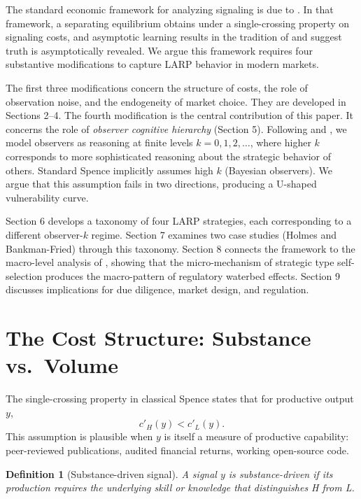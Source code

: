\documentclass[11pt]{article}
\newtheorem{definition}{Definition}
\begin{document}
The standard economic framework for analyzing signaling is due to \cite{spence1973}. In that framework, a separating equilibrium obtains under a single-crossing property on signaling costs, and asymptotic learning results in the tradition of \cite{diamond1989} and \cite{tirole1996} suggest truth is asymptotically revealed. We argue this framework requires four substantive modifications to capture LARP behavior in modern markets.

The first three modifications concern the structure of costs, the role of observation noise, and the endogeneity of market choice. They are developed in Sections 2--4. The fourth modification is the central contribution of this paper. It concerns the role of \emph{observer cognitive hierarchy} (Section 5). Following \cite{nagel1995} and \cite{camerer2004}, we model observers as reasoning at finite levels $k = 0, 1, 2, \ldots$, where higher $k$ corresponds to more sophisticated reasoning about the strategic behavior of others. Standard Spence implicitly assumes high $k$ (Bayesian observers). We argue that this assumption fails in two directions, producing a U-shaped vulnerability curve.

Section 6 develops a taxonomy of four LARP strategies, each corresponding to a different observer-$k$ regime. Section 7 examines two case studies (Holmes and Bankman-Fried) through this taxonomy. Section 8 connects the framework to the macro-level analysis of \cite{vosteen2026waterbed}, showing that the micro-mechanism of strategic type self-selection produces the macro-pattern of regulatory waterbed effects. Section 9 discusses implications for due diligence, market design, and regulation.

\section{The Cost Structure: Substance vs.\ Volume}

The single-crossing property in classical Spence states that for productive output $y$,
\[
c'_H(y) < c'_L(y).
\]
This assumption is plausible when $y$ is itself a measure of productive capability: peer-reviewed publications, audited financial returns, working open-source code.

\begin{definition}[Substance-driven signal]
A signal $y$ is \emph{substance-driven} if its production requires the underlying skill or knowledge that distinguishes H from L.
\end{definition}
\end{document}
